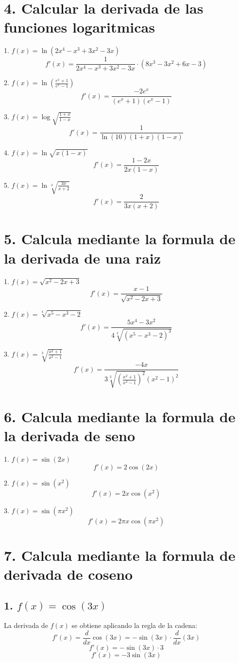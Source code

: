 \documentclass{article}
\begin{document}
\section*{4. Calcular la derivada de las funciones logaritmicas}

1. \( f(x) = \ln(2x^4 - x^3 + 3x^2 - 3x) \)
\[
    f'(x) = \frac{1}{2x^4 - x^3 + 3x^2 - 3x} \cdot (8x^3 - 3x^2 + 6x - 3)
\]

2. \( f(x) = \ln\left(\frac{e^x + 1}{e^x - 1}\right) \)
\[
    f'(x) = \frac{-2e^x}{(e^x + 1)(e^x - 1)}
\]

3. \( f(x) = \log \sqrt{\frac{1+x}{1-x}} \)
\[
    f'(x) = \frac{1}{\ln(10) (1+x)(1-x)}
\]

4. \( f(x) = \ln\sqrt{x(1-x)} \)
\[
    f'(x) = \frac{1-2x}{2x(1-x)}
\]

5. \( f(x) = \ln\sqrt[3]{\frac{3x}{x+2}} \)
\[
    f'(x) = \frac{2}{3x(x+2)}
\]

\section*{5. Calcula mediante la formula de la derivada de una raiz}

1. \( f(x) = \sqrt{x^2 - 2x + 3} \)  
\[
f'(x) = \frac{x - 1}{\sqrt{x^2 - 2x + 3}}
\]

2. \( f(x) = \sqrt[4]{x^5 - x^3 - 2} \)  
\[
f'(x) = \frac{5x^4 - 3x^2}{4 \sqrt[4]{(x^5 - x^3 - 2)^3}}
\]

3. \( f(x) = \sqrt[3]{\frac{x^2 + 1}{x^2 - 1}} \)  
\[
f'(x) = \frac{-4x}{3 \sqrt[3]{\left(\frac{x^2 + 1}{x^2 - 1}\right)^2} (x^2 - 1)^2}
\]

\section*{6. Calcula mediante la formula de la derivada de seno}

1. \( f(x) = \sin(2x) \)  
\[
f'(x) = 2\cos(2x)
\]

2. \( f(x) = \sin(x^2) \)  
\[
f'(x) = 2x\cos(x^2)
\]

3. \( f(x) = \sin(\pi x^2) \)  
\[
f'(x) = 2\pi x \cos(\pi x^2)
\]
\section*{7. Calcula mediante la formula de derivada de coseno}

\subsection*{1. $f(x) = \cos(3x)$}
La derivada de $f(x)$ se obtiene aplicando la regla de la cadena:
\[
f'(x) = \frac{d}{dx} \cos(3x) = -\sin(3x) \cdot \frac{d}{dx}(3x)
\]
\[
f'(x) = -\sin(3x) \cdot 3
\]
\[
f'(x) = -3\sin(3x)
\]
\end{document}
